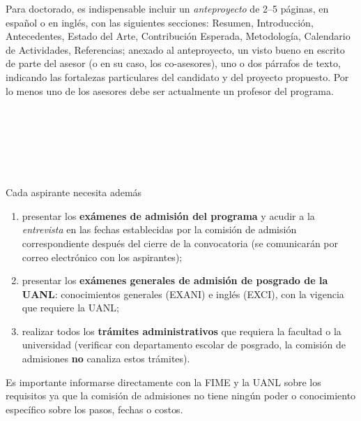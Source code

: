 \documentclass{article}
\begin{document}
\begin{Form}
Para doctorado, es indispensable incluir un {\em anteproyecto} de 2--5
páginas, en español o en inglés, con las siguientes secciones:
Resumen, Introducción, Antecedentes, Estado del Arte, Contribución
Esperada, Metodología, Calendario de Actividades, Referencias; anexado
al anteproyecto, un visto bueno en escrito de parte del asesor (o en
su caso, los co-asesores), uno o dos párrafos de texto, indicando las
fortalezas particulares del candidato y del proyecto propuesto. Por lo
menos uno de los asesores debe ser actualmente un profesor del
programa.

\begin{flushright}
 \\
 \\
 \\
 \\
 \\
\end{flushright}


Cada aspirante necesita además
\begin{enumerate}
\item presentar los {\bf exámenes de admisión del programa} y acudir a la
  {\em entrevista} en las fechas establecidas por la comisión de admisión
  correspondiente después del cierre de la convocatoria (se
  comunicarán por correo electrónico con los aspirantes);
\item presentar los {\bf exámenes generales de admisión de posgrado de
  la UANL}: conocimientos generales (EXANI) e inglés (EXCI), con la
  vigencia que requiere la UANL;
\item realizar todos los {\bf trámites administrativos} que requiera
  la facultad o la universidad (verificar con departamento escolar de
  posgrado, la comisión de admisiones {\bf no} canaliza estos
  trámites).
\end{enumerate}
Es importante informarse directamente con la FIME y la UANL sobre los
requisitos ya que la comisión de admisiones no tiene ningún poder o
conocimiento específico sobre los pasos, fechas o costos.

\end{Form}
\end{document}
